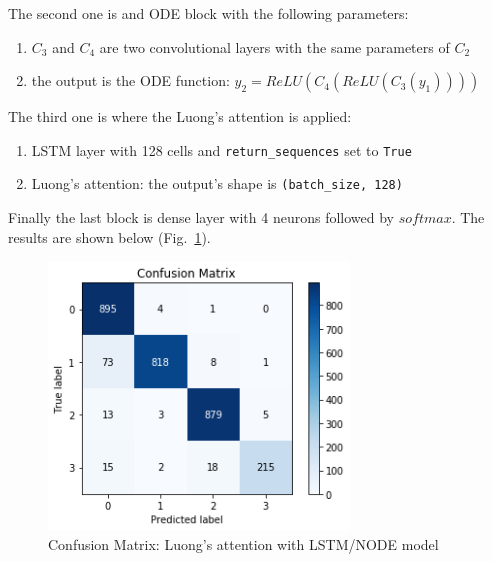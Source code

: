 \documentclass[LaM,binding=0.6cm]{sapthesis}
\begin{document}
The second one is and ODE block with the following parameters:
\begin{enumerate}
\item $C_3$ and $C_4$ are two convolutional layers with the same parameters of $C_2$
\item the output is the ODE function: $y_2=ReLU(C_4(ReLU(C_3(y_1))))$
\end{enumerate}
The third one is where the Luong's attention is applied:
\begin{enumerate}
\item LSTM layer with 128 cells and \texttt{return\_sequences} set to \texttt{True}
\item Luong's attention: the output's shape is \texttt{(batch\_size, 128)} 
\end{enumerate}
Finally the last block is dense layer with 4 neurons followed by $softmax$.
The results are shown below (Fig.~\ref{fig:lstmat3}).
\begin{figure}[H]  \centering
	\includegraphics[width=80mm,scale=0.7]{lstmat3}
	\caption{Confusion Matrix: Luong's attention with LSTM/NODE model}
	\label{fig:lstmat3}
\end{figure}
\end{document}
